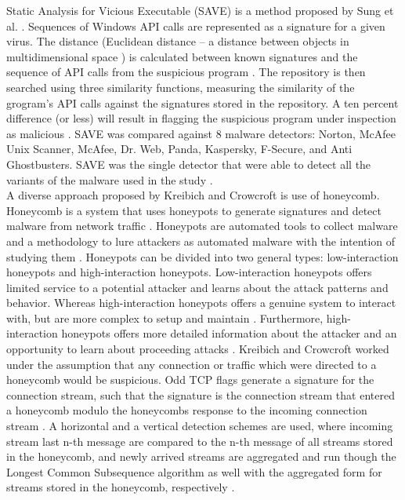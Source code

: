 \documentclass[12pt]{article} %
\begin{document}
Static Analysis for Vicious Executable (SAVE) is a method proposed by Sung et al. \cite{idika2007survey}. Sequences of Windows API calls are represented as a signature for a given virus. The distance (Euclidean distance – a distance between objects in multidimensional space \cite{deza2009encyclopedia, clusteranalysis}) is calculated between known signatures and the sequence of API calls from the suspicious program \cite{idika2007survey}. The repository is then searched using three similarity functions, measuring the similarity of the grogram’s API calls against the signatures stored in the repository. A ten percent difference (or less) will result in flagging the suspicious program under inspection as malicious \cite{idika2007survey}. SAVE was compared against 8 malware detectors: Norton, McAfee Unix Scanner, McAfee, Dr. Web, Panda, Kaspersky, F-Secure, and Anti Ghostbusters. SAVE was the single detector that were able to detect all the variants of the malware used in the study \cite{idika2007survey}.\\
A diverse approach proposed by Kreibich and Crowcroft \cite{idika2007survey} is use of honeycomb. Honeycomb is a system that uses honeypots to generate signatures and detect malware from network traffic \cite{idika2007survey}. Honeypots are automated tools to collect malware and a methodology to lure attackers as automated malware with the intention of studying them \cite{baecher2006nepenthes}. Honeypots can be divided into two general types: low-interaction honeypots and high-interaction honeypots. Low-interaction honeypots offers limited service to a potential attacker and learns about the attack patterns and behavior. Whereas high-interaction honeypots offers a genuine system to interact with, but are more complex to setup and maintain \cite{baecher2006nepenthes}. Furthermore, high-interaction honeypots offers more detailed information about the attacker and an opportunity to learn about proceeding attacks \cite{baecher2006nepenthes}. Kreibich and Crowcroft \cite{idika2007survey} worked under the assumption that any connection or traffic which were directed to a honeycomb would be suspicious. Odd TCP flags generate a signature for the connection stream, such that the signature is the connection stream that entered a honeycomb modulo the honeycombs response to the incoming connection stream \cite{idika2007survey}. A horizontal and a vertical detection schemes are used, where incoming stream last n-th message are compared to the n-th message of all streams stored in the honeycomb, and newly arrived streams are aggregated and run though the Longest Common Subsequence algorithm as well with the aggregated form for streams stored in the honeycomb, respectively \cite{idika2007survey}. \\ \\
\end{document}
